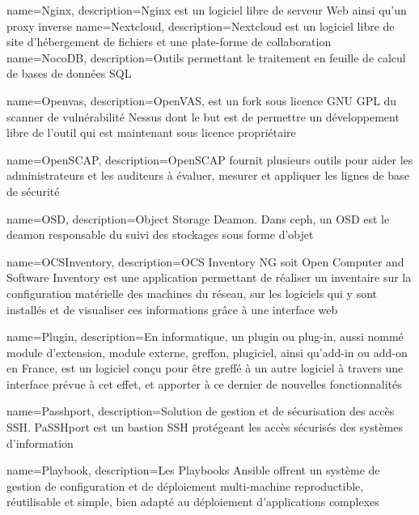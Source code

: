 {
    name=Nginx,
    description={Nginx est un logiciel libre de serveur Web ainsi qu'un proxy inverse}
}
{
    name=Nextcloud,
    description={Nextcloud est un logiciel libre de site d'hébergement de fichiers et une plate-forme de collaboration}
}
{
    name=NocoDB,
    description={Outils permettant le traitement en feuille de calcul de bases de données SQL}
}

{
    name=Openvas,
    description={OpenVAS, est un fork sous licence GNU GPL du scanner de vulnérabilité Nessus dont le but est de permettre un développement libre de l’outil qui est maintenant sous licence propriétaire}
}

{
    name=OpenSCAP,
    description={OpenSCAP fournit plusieurs outils pour aider les administrateurs et les auditeurs à évaluer, mesurer et appliquer les lignes de base de sécurité}
}

{
    name=OSD,
    description={Object Storage Deamon. Dans ceph, un OSD est le deamon responsable du suivi des stockages sous forme d'objet}
}

{
    name=OCSInventory,
    description={OCS Inventory NG soit Open Computer and Software Inventory est une application permettant de réaliser un inventaire sur la configuration matérielle des machines du réseau, sur les logiciels qui y sont installés et de visualiser ces informations grâce à une interface web}
}



{
    name=Plugin,
    description={En informatique, un plugin ou plug-in, aussi nommé module d'extension, module externe, greffon, plugiciel, ainsi qu'add-in ou add-on en France, est un logiciel conçu pour être greffé à un autre logiciel à travers une interface prévue à cet effet, et apporter à ce dernier de nouvelles fonctionnalités}
}

{
    name=Passhport,
    description={Solution de gestion et de sécurisation des accès SSH. PaSSHport est un bastion SSH protégeant les accès sécurisés des systèmes d'information}
}

{
    name=Playbook,
    description={Les Playbooks Ansible offrent un système de gestion de configuration et de déploiement multi-machine reproductible, réutilisable et simple, bien adapté au déploiement d'applications complexes}
}


